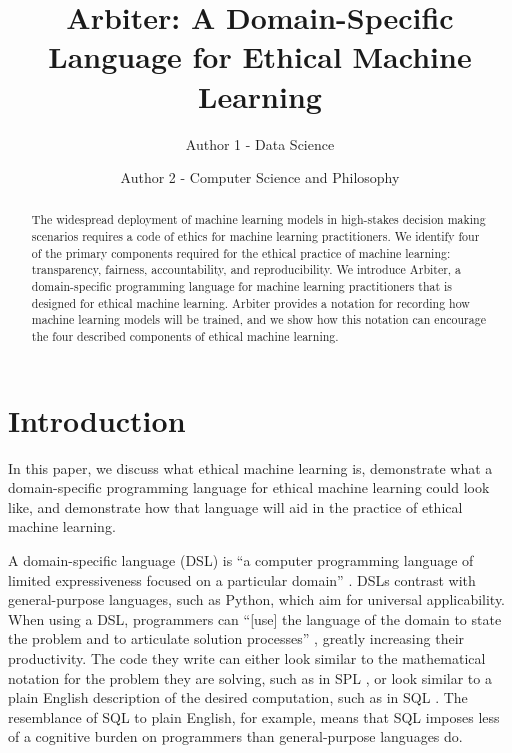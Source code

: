 \documentclass[letterpaper]{article}
\title{Arbiter: A Domain-Specific Language for Ethical Machine Learning}
\author{Author 1 - Data Science \and Author 2 - Computer Science and Philosophy }
\newcommand{\citep}[1]{\cite{#1}}
\begin{document}
\maketitle
\begin{abstract}
The widespread deployment of machine learning models in high-stakes decision making scenarios requires a code of ethics for machine learning practitioners. We identify four of the primary components required for the ethical practice of machine learning: transparency, fairness, accountability, and reproducibility. We introduce Arbiter, a domain-specific programming language for machine learning practitioners that is designed for ethical machine learning. Arbiter provides a notation for recording how machine learning models will be trained, and we show how this notation can encourage the four described components of ethical machine learning.
\end{abstract}


\section{Introduction}
In this paper, we discuss what ethical machine learning is, demonstrate what a domain-specific programming language for ethical machine learning could look like, and demonstrate how that language will aid in the practice of ethical machine learning. 

A domain-specific language (DSL) is ``a computer programming language of limited expressiveness focused on a particular domain'' \citep{Fowler2010}. DSLs contrast with general-purpose languages, such as Python, which aim for universal applicability. When using a DSL, programmers can ``[use] the language of the domain to state the problem and to articulate solution processes'' \citep{Felleisen2015}, greatly increasing their productivity. The code they write can either look similar to the mathematical notation for the problem they are solving, such as in SPL \citep{Werk2012}, or look similar to a plain English description of the desired computation, such as in SQL \citep{Date1997}. The resemblance of SQL to plain English, for example, means that SQL imposes less of a cognitive burden on programmers than general-purpose languages do.
\end{document}
